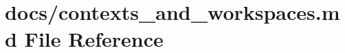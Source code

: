 \hypertarget{contexts__and__workspaces_8md}{}\section{docs/contexts\+\_\+and\+\_\+workspaces.md File Reference}
\label{contexts__and__workspaces_8md}
